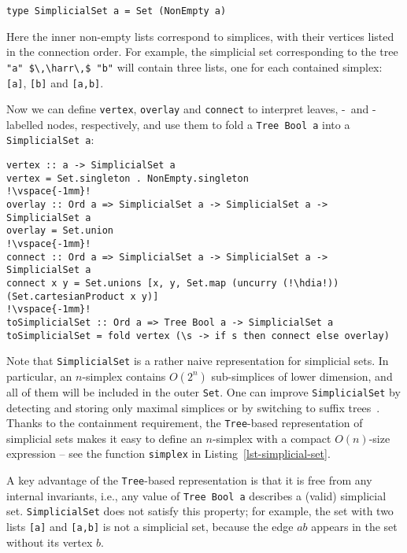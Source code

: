 \documentclass[english,submission]{programming}
\newcommand{\code}[1]{\lstinline[mathescape]|#1|}
\newcommand{\hcode}[1]{{\color{darkblue} \lstinline[keywordstyle={}]|#1|}} %
\newcommand{\hdia}{\,\text{\raisebox{-0.2mm}{\Large\color{darkblue} $\diamond$}}\,}
\newcommand{\harr}{\,\text{\color{darkblue} $\rightarrow$}\,}
\newcommand{\zero}{\raisebox{-0.2mm}{\textcircled{\textsf{0}}}\xspace}
\newcommand{\one}{\raisebox{-0.2mm}{\textcircled{\textsf{\hspace{-0.2mm}1}}}\xspace}
\begin{document}
\begin{lstlisting}
type SimplicialSet a = Set (NonEmpty a)
\end{lstlisting}

\noindent
Here the inner non-empty lists correspond to simplices, with their vertices
listed in the connection order. For example, the simplicial set corresponding to
the tree \code{"a" $\,\harr\,$ "b"} will contain three lists, one for each
contained simplex: \code{[a]}, \code{[b]} and \code{[a,b]}.

Now we can define \hcode{vertex}, \hcode{overlay} and \hcode{connect} to
interpret leaves, \zero-~and \one-labelled nodes, respectively, and
use them to fold a \hcode{Tree Bool a} into a \hcode{SimplicialSet a}:

\begin{lstlisting}
vertex :: a -> SimplicialSet a
vertex = Set.singleton . NonEmpty.singleton
!\vspace{-1mm}!
overlay :: Ord a => SimplicialSet a -> SimplicialSet a -> SimplicialSet a
overlay = Set.union
!\vspace{-1mm}!
connect :: Ord a => SimplicialSet a -> SimplicialSet a -> SimplicialSet a
connect x y = Set.unions [x, y, Set.map (uncurry (!\hdia!)) (Set.cartesianProduct x y)]
!\vspace{-1mm}!
toSimplicialSet :: Ord a => Tree Bool a -> SimplicialSet a
toSimplicialSet = fold vertex (\s -> if s then connect else overlay)
\end{lstlisting}

\noindent
Note that \hcode{SimplicialSet} is a rather naive representation for simplicial
sets. In particular, an $n$-simplex contains $O(2^n)$ sub-simplices of
lower dimension, and all of them will be included in the outer \hcode{Set}. One
can improve \hcode{SimplicialSet} by detecting and storing only maximal
simplices or by switching to suffix trees~\cite{weiner_suffix_trees}. Thanks to
the containment requirement, the \hcode{Tree}-based representation of simplicial
sets makes it easy to define an $n$-simplex with a compact $O(n)$-size
expression -- see the function \hcode{simplex} in
Listing~\ref{lst-simplicial-set}.

A key advantage of the \hcode{Tree}-based representation is that it is free from
any internal invariants, i.e., any value of \hcode{Tree Bool a} describes a
(valid) simplicial set. \hcode{SimplicialSet} does not satisfy this property;
for example, the set with two lists \code{[a]} and \code{[a,b]} is not a
simplicial set, because the edge $\textit{ab}$ appears in the set without its
vertex $\textit{b}$.
\end{document}
